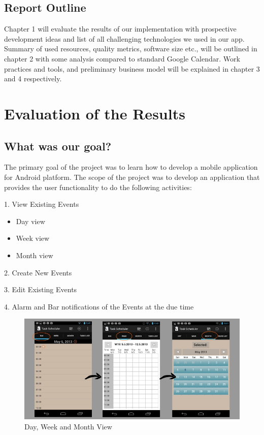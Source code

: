 \documentclass[10pt,a4paper]{report}
\begin{document}
\section{Report Outline}

Chapter 1 will evaluate the results of our implementation with prospective development ideas and list of all challenging technologies we used in our app. Summary of used resources, quality metrics, software size etc., will be outlined in chapter 2 with some analysis compared to standard Google Calendar. Work practices and tools, and preliminary business model will be explained in chapter 3 and 4 respectively.

 
\chapter{Evaluation of the Results}
\label{results}

\section{What was our goal?}
The primary goal of the project was to learn how to develop a mobile application for Android platform. The scope of the project was to develop an application that provides the user functionality to do the following activities:

\begin{description}
 \item 1. View Existing Events
  \begin{itemize}
    \item Day view
    \item Week view
    \item Month view
  \end{itemize}
  
  \item 2. Create New Events
  \item 3. Edit Existing Events
  \item 4. Alarm and Bar notifications of the Events at the due time
\end{description}

\begin{figure}[h!]
\begin{center}
\includegraphics[scale=.5]{daymonthweek.jpg}  
\end{center}
\caption{Day, Week and Month View}
\label{hd}
\end{figure}
\end{document}
